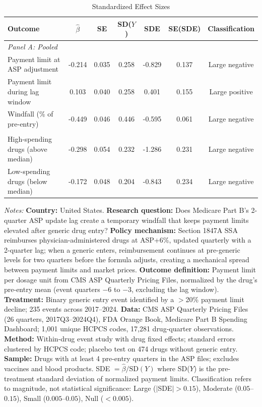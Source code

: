 \begin{table}[ht]
\centering
\begin{threeparttable}
\caption{Standardized Effect Sizes}
\label{tab:sde}
\footnotesize
\begin{tabular}{lcccccc}
\toprule
Outcome & $\hat{\beta}$ & SE & SD($Y$) & SDE & SE(SDE) & Classification \\
\midrule
\multicolumn{7}{l}{\textit{Panel A: Pooled}} \\
Payment limit at ASP adjustment & -0.214 & 0.035 & 0.258 & -0.829 & 0.137 & Large negative \\
Payment limit during lag window & 0.103 & 0.040 & 0.258 & 0.401 & 0.155 & Large positive \\
Windfall (\% of pre-entry) & -0.449 & 0.046 & 0.446 & -0.595 & 0.061 & Large negative \\
\addlinespace
\multicolumn{7}{l}{\textit{Panel B: Heterogeneous (by Medicare spending)}} \\
High-spending drugs (above median) & -0.298 & 0.054 & 0.232 & -1.286 & 0.231 & Large negative \\
Low-spending drugs (below median) & -0.172 & 0.048 & 0.204 & -0.843 & 0.234 & Large negative \\
\bottomrule
\end{tabular}
\begin{tablenotes}[flushleft]\footnotesize
\item \textit{Notes:} \textbf{Country:} United States. \textbf{Research question:} Does Medicare Part B's 2-quarter ASP update lag create a temporary windfall that keeps payment limits elevated after generic drug entry? \textbf{Policy mechanism:} Section 1847A SSA reimburses physician-administered drugs at ASP+6\%, updated quarterly with a 2-quarter lag; when a generic enters, reimbursement continues at pre-generic levels for two quarters before the formula adjusts, creating a mechanical spread between payment limits and market prices. \textbf{Outcome definition:} Payment limit per dosage unit from CMS ASP Quarterly Pricing Files, normalized by the drug's pre-entry mean (event quarters $-6$ to $-3$, excluding the lag window). \textbf{Treatment:} Binary generic entry event identified by a $>$20\% payment limit decline; 235 events across 2017--2024. \textbf{Data:} CMS ASP Quarterly Pricing Files (26 quarters, 2017Q3--2024Q4), FDA Orange Book, Medicare Part B Spending Dashboard; 1,001 unique HCPCS codes, 17,281 drug-quarter observations. \textbf{Method:} Within-drug event study with drug fixed effects; standard errors clustered by HCPCS code; placebo test on 474 drugs without generic entry. \textbf{Sample:} Drugs with at least 4 pre-entry quarters in the ASP files; excludes vaccines and blood products. SDE $= \hat{\beta} / \text{SD}(Y)$ where SD($Y$) is the pre-treatment standard deviation of normalized payment limits. Classification refers to magnitude, not statistical significance: Large ($|$SDE$| > 0.15$), Moderate ($0.05$--$0.15$), Small ($0.005$--$0.05$), Null ($< 0.005$).
\end{tablenotes}
\end{threeparttable}
\end{table}

